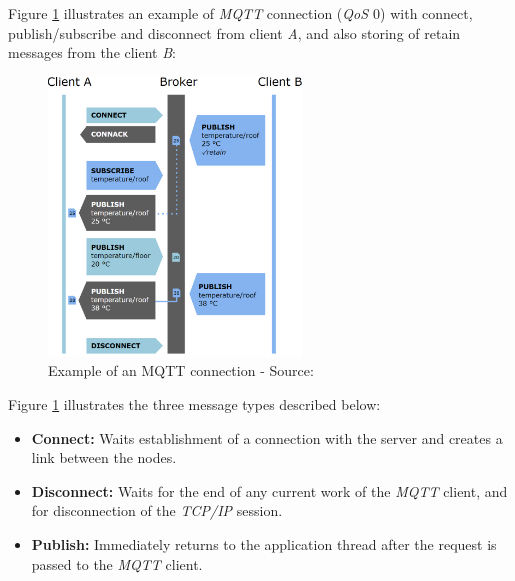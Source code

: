 \documentclass[report.tex]{subfiles}
\begin{document}
Figure \ref{fig:mqtt_message_type} illustrates an example of \textit{MQTT} connection (\textit{QoS $0$}) with connect, publish/subscribe and disconnect from client \textit{A}, and also storing of retain messages from the client \textit{B}:

\begin{figure}[H]
\centering
	\includegraphics[width=0.6\textwidth]{Include/Figure/research/mqtt_message_type.png}
	\caption{Example of an MQTT connection - Source: \cite{MQTT}}
\label{fig:mqtt_message_type}
\end{figure}

Figure \ref{fig:mqtt_message_type} illustrates the three message types described below:
\begin{itemize}
\item \textbf{Connect:} Waits establishment of a connection with the server and creates a link between the nodes.
\item \textbf{Disconnect:} Waits for the end of any current work of the \textit{MQTT} client, and for disconnection of the \textit{TCP/IP} session.
\item \textbf{Publish:} Immediately returns to the application thread after the request is passed to the \textit{MQTT} client.

\end{itemize}
\end{document}

